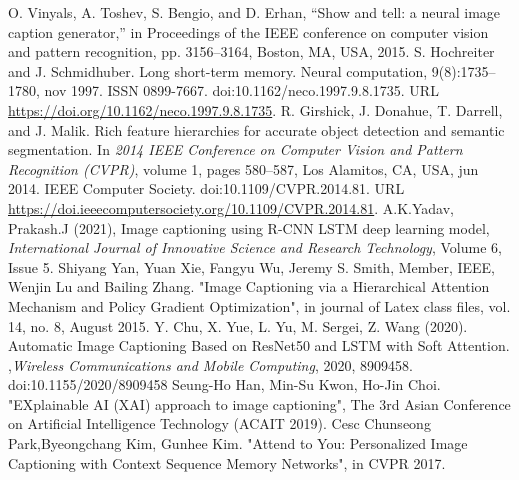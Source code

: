 \documentclass[conference]{IEEEtran}
\begin{document}
\begin{thebibliography}{00}
 O. Vinyals, A. Toshev, S. Bengio, and D. Erhan, “Show and tell: a neural image caption generator,” in Proceedings of the IEEE conference on computer vision and pattern recognition, pp. 3156–3164, Boston, MA, USA, 2015.
 S. Hochreiter and J. Schmidhuber. Long short-term memory. Neural computation, 9(8):1735–1780, nov 1997. ISSN 0899-7667. doi:10.1162/neco.1997.9.8.1735. URL \href{https://doi.org/10.1162/neco.1997.9.8.1735}{https://doi.org/10.1162/neco.1997.9.8.1735}.
 R. Girshick, J. Donahue, T. Darrell, and J. Malik. Rich feature hierarchies for accurate object detection and semantic segmentation. In \textit{2014 IEEE Conference on Computer Vision and Pattern Recognition (CVPR)}, volume 1, pages 580–587, Los Alamitos, CA, USA, jun 2014. IEEE Computer Society. doi:10.1109/CVPR.2014.81. URL \href{https://doi.ieeecomputersociety.org/10.1109/CVPR.2014.81}{https://doi.ieeecomputersociety.org/10.1109/CVPR.2014.81}.
 A.K.Yadav, Prakash.J  (2021), Image captioning using R-CNN LSTM deep learning model, \textit{International Journal of Innovative Science and Research Technology}, Volume 6, Issue 5.
Shiyang Yan, Yuan Xie, Fangyu Wu, Jeremy S. Smith, Member, IEEE, Wenjin Lu and Bailing Zhang. "Image Captioning via a Hierarchical Attention Mechanism and Policy Gradient Optimization", in journal of Latex class files, vol. 14, no. 8, August 2015.
Y. Chu, X. Yue, L. Yu, M. Sergei, Z. Wang (2020). Automatic Image Captioning Based on ResNet50 and LSTM with Soft Attention. ,\textit{Wireless Communications and Mobile Computing}, 2020, 8909458. doi:10.1155/2020/8909458
 Seung-Ho Han, Min-Su Kwon, Ho-Jin Choi. "EXplainable AI (XAI) approach to image captioning", The 3rd Asian Conference on Artificial Intelligence Technology (ACAIT 2019).
 Cesc Chunseong Park,Byeongchang Kim, Gunhee Kim. "Attend to You: Personalized Image Captioning with Context Sequence Memory Networks", in CVPR 2017.
\end{thebibliography}
\end{document}
